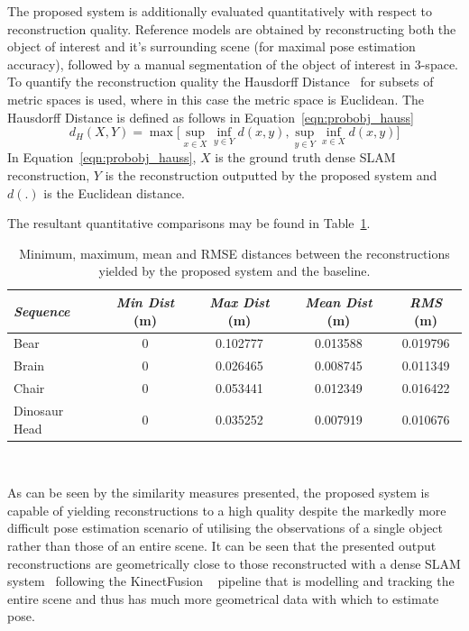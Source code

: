The proposed system is additionally evaluated quantitatively with respect to reconstruction 
quality. Reference models are obtained by reconstructing both the object of interest and it's 
surrounding scene (for maximal pose estimation accuracy), followed by a manual segmentation of 
the object of interest in 3-space. To quantify the reconstruction quality the Hausdorff 
Distance~\cite{Rote1991} for subsets of metric spaces is used, where in this case the metric 
space is Euclidean. The Hausdorff Distance is defined as follows in Equation~\ref{eqn:probobj_hauss}
\begin{equation}
  \label{eqn:probobj_hauss}
  d_{H}(X, Y) = \max \Bigg[
  \sup_{x \in X} \inf_{y \in Y} d(x, y), \sup_{y \in Y} \inf_{x \in X} d(x, y) 
  \Bigg]
\end{equation}
In Equation~\ref{eqn:probobj_hauss}, \(X\) is the ground truth dense SLAM reconstruction, 
\(Y\) is the reconstruction outputted by the proposed system and \(d(.)\) is the Euclidean 
distance.

The resultant quantitative comparisons may be found in Table~\ref{table:probobj_hauss}.
\begin{table}[!htbp]
  \centering
  \begin{tabular}{lcccc}
    \emph{Sequence} & \emph{Min Dist} (m) & \emph{Max Dist} (m) & \emph{Mean Dist} (m) & \emph{RMS} (m)\\
    \midrule
    \textsf{Bear} & 0 & 0.102777 & 0.013588 & 0.019796 \\
    \textsf{Brain} & 0 & 0.026465 & 0.008745 & 0.011349 \\
    \textsf{Chair} & 0 & 0.053441 & 0.012349 & 0.016422 \\
    \textsf{Dinosaur Head} & 0 & 0.035252 & 0.007919 & 0.010676
  \end{tabular}
  \caption[Probabilistic Object Reconstruction Hausdorff Distance]
  {Minimum, maximum, mean and RMSE distances between the reconstructions yielded by 
  the proposed system and the baseline.}
~\label{table:probobj_hauss}
\end{table}

As can be seen by the similarity measures presented, the proposed system is capable of 
yielding reconstructions to a high quality despite the markedly more difficult pose estimation 
scenario of utilising the observations of a single object rather than those of an entire scene. 
It can be seen that the presented output reconstructions are geometrically close to those 
reconstructed with a dense SLAM system~\cite{Prisacariu2014} following the KinectFusion 
~\cite{Newcombe2011} pipeline that is modelling and tracking the entire scene and thus has 
much more geometrical data with which to estimate pose.


